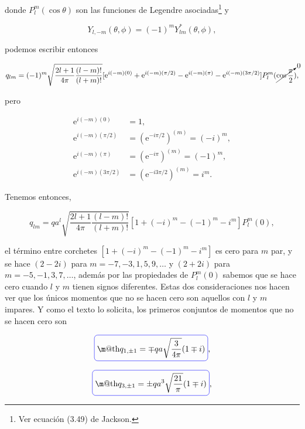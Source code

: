 \documentclass[a4paper,11pt]{article}
\makeatletter
\numberwithin{equation}{section}
\newcommand*{\boxcolor}{blue}
\renewcommand{\boxed}[1]{\textcolor{\boxcolor}{%
\tikz[baseline={([yshift=-1ex]current bounding box.center)}] \node [rectangle, minimum width=1ex,rounded corners,draw] {\normalcolor\m@th$\displaystyle#1$};}}
\newcommand{\euler}{\mathrm{e}}
\makeatother
\begin{document}
donde $P_l^m(\cos{\theta})$ son las funciones de Legendre asociadas\footnote{Ver ecuación 
(3.49) de Jackson.} y

\begin{equation}
 Y_{l,-m}(\theta,\phi) = (-1)^m Y^*_{lm}(\theta,\phi), 
\end{equation}

podemos escribir entonces 

\begin{equation*}
 q_{lm} = (-1)^m\sqrt{\frac{2l+1}{4\pi}\frac{(l-m)!}{(l+m)!}} [\euler^{i(-m)(0)} + 
 \euler^{i(-m)(\pi/2)} - \euler^{i(-m)(\pi)} - \euler^{i(-m)(3\pi/2)}] 
 P_l^m(\cancelto{0}{\cos{\frac{\pi}{2}}}),
\end{equation*}

pero 

\begin{align*}
 \euler^{i(-m)(0)} &= 1, \\
 \euler^{i(-m)(\pi/2)} &= (\euler^{-i\pi/2})^{(m)} = (-i)^m, \\
 \euler^{i(-m)(\pi)} &= (\euler^{-i\pi})^{(m)} = (-1)^m, \\
 \euler^{i(-m)(3\pi/2)} &= (\euler^{-i3\pi/2})^{(m)} = i^m.
\end{align*}

Tenemos entonces, 

\begin{equation}
 q_{lm} = qa^l\sqrt{\frac{2l+1}{4\pi}\frac{(l-m)!}{(l+m)!}}\left[1 + 
 (-i)^m - (-1)^m - i^m \right]P_l^m(0),
\end{equation}

el término entre corchetes $\left[1 +  (-i)^m - (-1)^m - i^m \right]$ es cero 
para $m$ par, y se hace $(2-2i)$ para $m = -7,-3,1,5,9,\dots$ y $(2+2i)$ para 
$m=-5,-1,3,7,\dots$, además por las propiedades de $P_l^m(0)$ sabemos que se 
hace cero cuando $l$ y $m$ tienen signos diferentes. Estas dos consideraciones 
nos hacen ver que los únicos momentos que no se hacen cero son aquellos con 
$l$ y $m$ impares. Y como el texto lo solicita, los primeros conjuntos de momentos 
que no se hacen cero son 

\begin{equation}
 \boxed{q_{1,\pm 1} = \mp qa\sqrt{\frac{3}{4\pi}} (1 \mp i)},
\end{equation}

\begin{equation}
 \boxed{q_{3,\pm 1} = \pm qa^3\sqrt{\frac{21}{\pi}} (1 \mp i)},
\end{equation}
\end{document}
